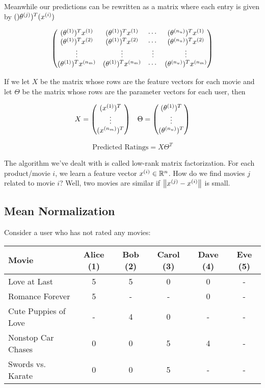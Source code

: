 Meanwhile our predictions can be rewritten as a matrix where each entry is given by $()\theta_{}^{(j)})^T (x_{}^{(i)})$

\[
    \mqty(
        (\theta\s{1})^T x\s{1} & (\theta\s{1})^T x\s{1} & \cdots & (\theta\s{n_u})^T x\s{1} \\
        (\theta\s{1})^T x\s{2} & (\theta\s{1})^T x\s{2} & \cdots & (\theta\s{n_u})^T x\s{2} \\
        \vdots & \vdots & \vdots & \vdots \\
        (\theta\s{1})^T x\s{n_m} & (\theta\s{1})^T x\s{n_m} & \cdots &  (\theta\s{n_u})^T x\s{n_m}
    )
\]

If we let $X$ be the matrix whose rows are the feature vectors for each movie and let $\Theta$ be
the matrix whose rows are the parameter vectors for each user, then

\[
    X = \mqty( (x\s{1})^T \\ \vdots \\ (x\s{n_m})^T )
    \quad
    \Theta = \mqty( (\theta\s{1})^T \\ \vdots \\ (\theta\s{n_u})^T )
\]

\[
    \text{Predicted Ratings} = X\Theta^T
\]

The algorithm we've dealt with is called low-rank matrix factorization.
For each product/movie $i$, we learn a feature vector $x_{}^{(i)} \in \mathbb{R}^n$.
How do we find movies $j$ related to movie $i$?
Well, two movies are similar if $\left\lVert x_{}^{(j)} - x_{}^{(i)} \right\rVert$ is small.

\subsection{Mean Normalization}

Consider a user who has not rated any movies:

\begin{center}
\begin{tabular}{l|ccccc}
    Movie                & Alice (1) & Bob (2) & Carol (3) & Dave (4) & Eve (5) \\ \hline
    Love at Last         & 5 & 5 & 0 & 0 & - \\
    Romance Forever      & 5 & - & - & 0 & - \\
    Cute Puppies of Love & - & 4 & 0 & - & - \\
    Nonstop Car Chases   & 0 & 0 & 5 & 4 & - \\
    Swords vs. Karate    & 0 & 0 & 5 & - & -
\end{tabular}
\end{center}

